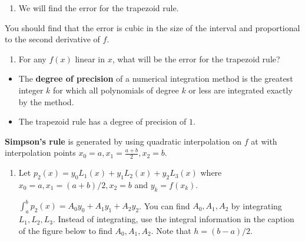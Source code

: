 \documentclass[12pt,letterpaper,noanswers]{exam}
\begin{document}
\begin{enumerate}[resume=classQ]
\item We will find the error for the trapezoid rule.
\end{enumerate}
You should find that the error is cubic in the size of the interval and proportional to the second derivative of $f$.
\begin{enumerate}[resume=classQ]
\item For any $f(x)$ linear in $x$, what will be the error for the trapezoid rule?
\vspace{1cm}
\end{enumerate}

\begin{tcolorbox}
\begin{itemize}
\itemsep0pt
    \item The {\bf degree of precision} of a numerical integration method is the greatest integer $k$ for which all polynomials of degree $k$ or less are integrated exactly by the method.
\item The trapezoid rule has a degree of precision of $1$.
\end{itemize}

\end{tcolorbox}
\begin{tcolorbox}
\textbf{Simpson's rule} is generated by using quadratic interpolation on $f$ at with interpolation points $x_0 = a, x_1 = \frac{a+b}{2}, x_2 = b$.
\end{tcolorbox}
\begin{enumerate}[resume=classQ]
    \item Let $p_2(x) = y_0L_1(x) + y_1L_2(x)+y_2L_3(x)$ where $x_0 = a, x_1 = (a+b)/2, x_2 = b$ and $y_k = f(x_k)$.  
    
    $\displaystyle\int_a^b p_2(x) = A_0 y_0 + A_1 y_1 + A_2 y_2$.  You can find $A_0, A_1, A_2$ by integrating $L_1, L_2, L_3$.  Instead of integrating, use the integral information in the caption of the figure below to find $A_0, A_1, A_2$.  Note that $h = (b-a)/2$.
\end{enumerate}
\end{document}
